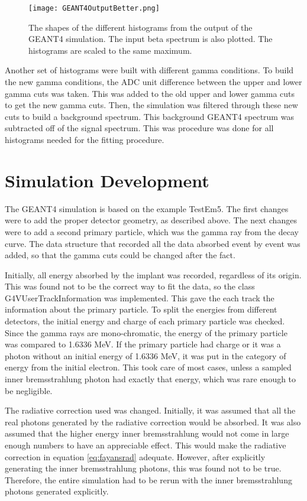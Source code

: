 \documentclass[../MaxHughesThesis.tex]{subfiles}
\begin{document}
\begin{figure}[!htb]
	\centerline{\texttt{[image: GEANT4OutputBetter.png]}}
	\caption{The shapes of the different histograms from the output of the GEANT4 simulation.
		 The input beta spectrum is also plotted.
		 The histograms are scaled to the same maximum.}
	\label{fig:GEANT4Hists}
\end{figure}

Another set of histograms were built with different gamma conditions.
To build the new gamma conditions, the ADC unit difference between the upper and lower gamma cuts was taken.
This was added to the old upper and lower gamma cuts to get the new gamma cuts.
Then, the simulation was filtered through these new cuts to build a background spectrum.
This background GEANT4 spectrum was subtracted off of the signal spectrum.  
This was procedure was done for all histograms needed for the fitting procedure.

\section{Simulation Development}
The GEANT4 simulation is based on the example TestEm5.
The first changes were to add the proper detector geometry, as described above.
The next changes were to add a second primary particle, which was the gamma ray from the decay curve.
The data structure that recorded all the data absorbed event by event was added, so that the gamma cuts could be changed after the fact.

Initially, all energy absorbed by the implant was recorded, regardless of its origin.
This was found not to be the correct way to fit the data, so the class G4VUserTrackInformation was implemented.
This gave the each track the information about the primary particle.
To split the energies from different detectors, the initial energy and charge of each primary particle was checked.
Since the gamma rays are mono-chromatic, the energy of the primary particle was compared to 1.6336 MeV.
If the primary particle had charge or it was a photon without an initial energy of 1.6336 MeV, it was put in the category of energy from the initial electron. 
This took care of most cases, unless a sampled inner bremsstrahlung photon had exactly that energy, which was rare enough to be negligible.

The radiative correction used was changed.
Initially, it was assumed that all the real photons generated by the radiative correction would be absorbed.
It was also assumed that the higher energy inner bremsstrahlung would not come in large enough numbers to have an appreciable effect. 
This would make the radiative correction in equation \ref{eq:fayansrad} adequate. 
However, after explicitly generating the inner bremsstrahlung photons, this was found not to be true.
Therefore, the entire simulation had to be rerun with the inner bremsstrahlung photons generated explicitly.
\end{document}

